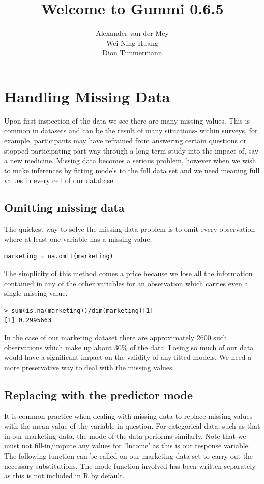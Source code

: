 \documentclass[11pt]{article}
\title{\textbf{Welcome to Gummi 0.6.5}}
\author{Alexander van der Mey\\
		Wei-Ning Huang\\
		Dion Timmermann}
\date{}
\begin{document}
\maketitle

\section{Handling Missing Data}

Upon first inspection of the data we see there are many missing values. This is common in datasets and can be the result of many situations- within surveys, for example, participants may have refrained from answering certain questions or stopped participating part way through a long term study into the impact of, say a new medicine. 
Missing data becomes a serious problem, however when we wish to make inferences by fitting models to the full data set and we need meaning full values in every cell of our database. 

\subsection{Omitting missing data}
The quickest way to solve the missing data problem is to omit every observation where at least one variable has a missing value.  

\begin{verbatim}  
marketing = na.omit(marketing)  
\end{verbatim}

The simplicity of this method comes a price because we lose all the information contained in any of the other variables for an observation which carries even a single missing value.


\begin{verbatim}
> sum(is.na(marketing))/dim(marketing)[1]
[1] 0.2995663
\end{verbatim}

In the case of our marketing dataset there are approximately 2600 such observations which make up about 30\% of the data. Losing so much of our data would have a significant impact on the validity of any fitted models. We need a more preservative way to deal with the missing values.

\subsection{Replacing with the predictor mode}
It is common practice when dealing with missing data to replace missing values with the mean value of the variable in question. For categorical data, such as that in our marketing data, the mode of the data performs similarly. Note that we must not fill-in/impute any values for 'Income' as this is our response variable.
The following function can be called on our marketing data set to carry out the necessary substitutions. The mode function involved has been written separately as this is not included in R by default.
\end{document}
